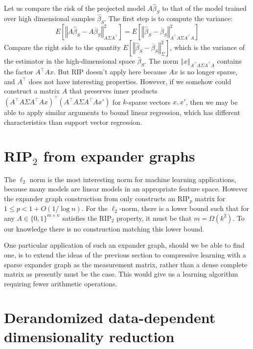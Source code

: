 \documentclass[english]{article}
\theoremstyle{plain}
\begin{document}
Let us compare the risk of the projected model $A\widehat{\beta}_{S}$ to that of the model trained over high dimensional samples $\widehat{\beta}_S$.
The first step is to compute the variance:
\[
E\left[\left\Vert A\widehat{\beta}_{S}-A\overline{\beta}_{S}\right\Vert _{A\Sigma A^{\top}}^{2}\right]=E\left[\left\Vert \widehat{\beta}_{S}-\overline{\beta}_{S}\right\Vert _{A^{\top}A\Sigma A^{\top}A}^{2}\right]
\] 
Compare the right side to the quantity $E\left[\left\Vert \widehat{\beta}_{S}-\overline{\beta}_{S}\right\Vert _{\Sigma}^{2}\right]$, which is the variance of the estimator in the high-dimensional space $\widehat{\beta}_S$.
The norm $\left\Vert x \right\Vert_{A^\top A \Sigma A^\top A}$ contains the factor $A^\top Ax$.
But RIP doesn't apply here because $Ax$ is no longer sparse, and $A^\top$ does not have interesting properties.
However, if we somehow could construct a matrix $A$ that preserves inner products $(A^{\top}A\Sigma A^{\top}Ax)^\top(A^{\top}A\Sigma A^{\top}Ax')$ for $k$-sparse vectors $x,x'$, then we may be able to apply similar arguments to bound linear regression, which has different characteristics than support vector regression.

\section{RIP$_2$ from expander graphs}

The $\ell_2$ norm is the most interesting norm for machine learning applications, because many models are linear models in an appropriate feature space. However the expander graph construction from \citet{Berinde2008} only constructs an RIP$_p$ matrix for $1 \le p < 1+O(1/\log n)$. For the $\ell_2$-norm, there is a lower bound such that for any $A \in \{0,1\}^{m\times n}$ satisfies the RIP$_2$ property, it must be that $m = \Omega(k^2)$. To our knowledge there is no construction matching this lower bound. 

One particular application of such an expander graph, should we be able to find one, is to extend the ideas of the previous section to compressive learning with a sparse expander graph as the measurement matrix, rather than a dense complete matrix as presently must be the case. This would give us a learning algorithm requiring fewer arithmetic operations.

\section{Derandomized data-dependent dimensionality reduction}
\end{document}
